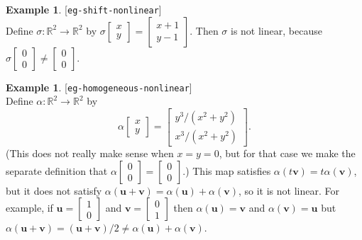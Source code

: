 \documentclass{amsart}
\newcommand{\lbl}[1]{\label{#1}\textup{[\texttt{#1}]}\ \\}
\newcommand{\lbl}{\label}
\newcommand{\R}         {{\mathbb{R}}}
\newcommand{\bsm}       {\left[\begin{smallmatrix}}
\newcommand{\esm}       {\end{smallmatrix}\right]}
\newcommand{\al}        {\alpha}
\newcommand{\sg}        {\sigma}
\newcommand{\xra}       {\xrightarrow}
\newcommand{\vu}        {\mathbf{u}}
\newcommand{\vv}        {\mathbf{v}}
\renewcommand{\:}       {\colon}
\theoremstyle{definition}
\newtheorem{example}[theorem]{Example}
\begin{document}
\begin{example}\lbl{eg-shift-nonlinear}
 Define $\sg\:\R^2\xra{}\R^2$ by
 $\sg\bsm x\\ y\esm=\bsm x+1\\ y-1\esm$.  Then
 $\sg$ is not linear, because
 $\sg\bsm 0\\0\esm\neq\bsm 0\\0\esm$.
\end{example}

\begin{example}\lbl{eg-homogeneous-nonlinear}
 Define $\al\:\R^2\to\R^2$ by 
 \[ \al\bsm x \\ y\esm =
     \bsm y^3/(x^2+y^2) \\ x^3/(x^2+y^2) \esm.
 \]
 (This does not really make sense when $x=y=0$, but for that
 case we make the separate definition that
 $\al\bsm 0\\0\esm=\bsm 0\\0\esm$.)  This map satisfies
 $\al(t\vv)=t\al(\vv)$, but it does not satisfy
 $\al(\vu+\vv)=\al(\vu)+\al(\vv)$, so it is not linear.  For
 example, if $\vu=\bsm 1\\0\esm$ and $\vv=\bsm 0\\1\esm$
 then $\al(\vu)=\vv$ and $\al(\vv)=\vu$ but
 $\al(\vu+\vv)=(\vu+\vv)/2\neq\al(\vu)+\al(\vv)$.
\end{example}
\end{document}
